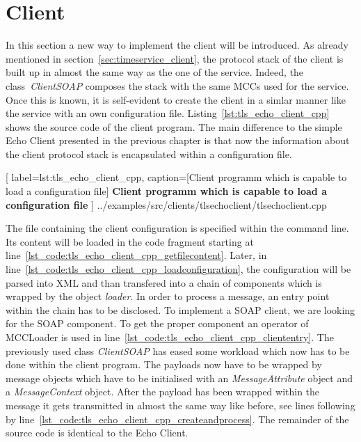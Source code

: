 \clearpage
\section{Client}

In this section a new way to implement the client will be introduced. As already mentioned in section~\ref{sec:timeservice_client}, the protocol stack of the client is built up in almost the same way as the one of the service. Indeed, the class~\textit{ClientSOAP} composes the stack with the same MCCs used for the service. Once this is known, it is self-evident to create the client in a simlar manner like the service with an own configuration file.
Listing~\ref{lst:tls_echo_client_cpp} shows the source code of the client program. The main difference to the simple Echo Client presented in the previous chapter is that now the information about the client protocol stack is encapsulated within a configuration file.\\

	[
	label=lst:tls_echo_client_cpp,
	caption={[Client programm which is capable to load a configuration file]
	\textbf{Client programm which is capable to load a configuration file}}
	]
{../examples/src/clients/tlsechoclient/tlsechoclient.cpp}


The file containing the client configuration is specified within the command line. 
Its content will be loaded in the code fragment starting at line~\ref{lst_code:tls_echo_client_cpp_getfilecontent}. 
Later, in line~\ref{lst_code:tls_echo_client_cpp_loadconfiguration}, the configuration will be parsed into XML and than transfered into a chain of components which is wrapped by the object \textit{loader}. In order to process a message, an entry point within the chain has to be disclosed. To implement a SOAP client, we are looking for the SOAP component. 
To get the proper component an operator of MCCLoader is used in line~\ref{lst_code:tls_echo_client_cpp_cliententry}.
The previously used class \textit{ClientSOAP} has eased some workload which now has to be done within the client program.
The payloads now have to be wrapped by message objects which have to be initialised with an \textit{MessageAttribute} object and a \textit{MessageContext} object. After the payload has been wrapped within the message it gets transmitted in almost the same way like before, see lines following by line~\ref{lst_code:tls_echo_client_cpp_createandprocess}. The remainder of the source code is identical to the Echo Client.\\





